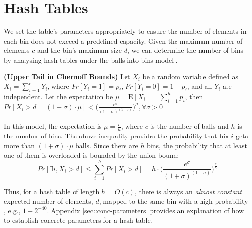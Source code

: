 
\vspace{-4mm}
\section{Hash Tables}\label{Preliminary-Hash-Table}

We set the table's parameters appropriately to ensure the number of elements in each bin does not exceed a predefined capacity. Given the maximum number of elements $c$ and the bin's maximum size $d$, we can determine the number of bins by analysing hash tables under the balls into bins model  \cite{DBLP:conf/stoc/BerenbrinkCSV00}.
\vspace{-1mm}
\begin{theorem}\label{chernoff}\textbf{(Upper Tail in Chernoff Bounds)} Let $X_{\scriptscriptstyle i}$ be a random variable defined as $X_{\scriptscriptstyle i}=\sum\limits^{\scriptscriptstyle c}_{\scriptscriptstyle  i=1} Y_{\scriptscriptstyle i}$, where $Pr[Y_{\scriptscriptstyle i}=1]=p_{\scriptscriptstyle i}$, $Pr[Y_{\scriptscriptstyle i}=0]=1-p_{\scriptscriptstyle i}$, and all $Y_{\scriptscriptstyle i}$ are independent. Let the expectation be $\mu=\mathrm{E}[X_{\scriptscriptstyle i}]=\sum\limits ^{\scriptscriptstyle h}_{\scriptscriptstyle  i=1} p_{\scriptscriptstyle i}$, then 
$Pr[X_{\scriptscriptstyle i}>d=(1+\sigma)\cdot \mu]<\Big(\frac{e^{\scriptscriptstyle \sigma}}{(1+\sigma)^{\scriptscriptstyle (1+\sigma)}}\Big)^{\scriptscriptstyle \mu}, \forall \sigma>0$
\end{theorem}

In this model, the expectation is  $\mu=\frac{c}{h}$, where $c$ is the number of  balls and $h$ is the number of bins. The above inequality provides the probability that bin $i$ gets more than $(1+\sigma)\cdot \mu$ balls. Since there are $h$ bins, the probability that at least one of them is overloaded is bounded by the union bound:
\begin{equation}\label{equation:the-bound}
Pr[\exists i, X_{\scriptscriptstyle i}>d]\leq \sum\limits^{\scriptscriptstyle h}_{\scriptscriptstyle i=1}Pr[X_{\scriptscriptstyle i}>d] = h\cdot  \Big(\frac{e^{\scriptscriptstyle \sigma}}{(1+\sigma)^{\scriptscriptstyle (1+\sigma)}}\Big)^{\scriptscriptstyle \frac{c}{h}}
\end{equation}

Thus, for a hash table of length $h=O(c)$, there is always an  \emph{almost constant} expected number of elements, $d$,  mapped to the same bin  with a high probability \cite{DBLP:conf/ccs/PapamanthouTT08}, e.g., $1-2^{\scriptscriptstyle -40}$. 
%
Appendix \ref{sec::conc-parameters} provides an explanation of how to establish concrete parameters for a hash table.
